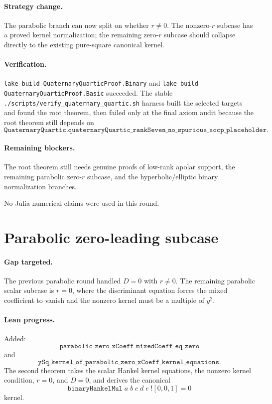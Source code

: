 \documentclass[11pt]{article}
\begin{document}
\paragraph{Strategy change.}
The parabolic branch can now split on whether \(r\ne0\).  The nonzero-\(r\)
subcase has a proved kernel normalization; the remaining zero-\(r\) subcase
should collapse directly to the existing pure-square canonical kernel.

\paragraph{Verification.}
\texttt{lake build QuaternaryQuarticProof.Binary} and
\texttt{lake build QuaternaryQuarticProof.Basic} succeeded.  The stable
\texttt{./scripts/verify\_quaternary\_quartic.sh} harness built the selected
targets and found the root theorem, then failed only at the final axiom audit
because the root theorem still depends on
\[
\texttt{QuaternaryQuartic.quaternaryQuartic\_rankSeven\_no\_spurious\_socp\_placeholder}.
\]

\paragraph{Remaining blockers.}
The root theorem still needs genuine proofs of low-rank apolar support, the
remaining parabolic zero-\(r\) subcase, and the hyperbolic/elliptic binary
normalization branches.

No Julia numerical claims were used in this round.

\section*{Parabolic zero-leading subcase}

\paragraph{Gap targeted.}
The previous parabolic round handled \(D=0\) with \(r\ne0\).  The remaining
parabolic scalar subcase is \(r=0\), where the discriminant equation forces the
mixed coefficient to vanish and the nonzero kernel must be a multiple of
\(y^2\).

\paragraph{Lean progress.}
Added:
\[
\texttt{parabolic\_zero\_xCoeff\_mixedCoeff\_eq\_zero}
\]
and
\[
\texttt{ySq\_kernel\_of\_parabolic\_zero\_xCoeff\_kernel\_equations}.
\]
The second theorem takes the scalar Hankel kernel equations, the nonzero kernel
condition, \(r=0\), and \(D=0\), and derives the canonical
\[
\texttt{binaryHankelMul}\;a\;b\;c\;d\;e\;![0,0,1]=0
\]
kernel.
\end{document}
